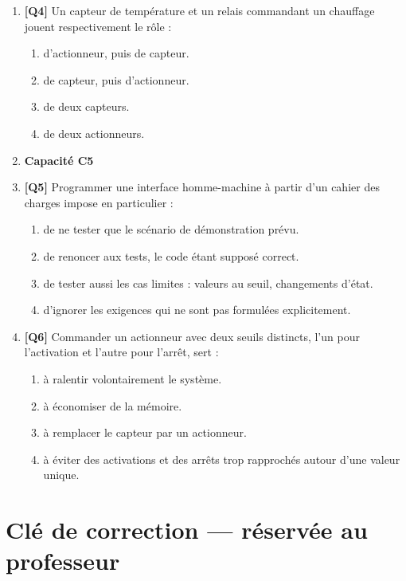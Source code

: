 \begin{enumerate}
\item \textbf{[Q4]} Un capteur de température et un relais commandant un chauffage jouent respectivement le rôle :
  \begin{enumerate}[label=\Alph*.]
    \item d'actionneur, puis de capteur.
    \item de capteur, puis d'actionneur.
    \item de deux capteurs.
    \item de deux actionneurs.
  \end{enumerate}

\item[] \textbf{Capacité C5}

\item \textbf{[Q5]} Programmer une interface homme-machine à partir d'un cahier des charges impose en particulier :
  \begin{enumerate}[label=\Alph*.]
    \item de ne tester que le scénario de démonstration prévu.
    \item de renoncer aux tests, le code étant supposé correct.
    \item de tester aussi les cas limites : valeurs au seuil, changements d'état.
    \item d'ignorer les exigences qui ne sont pas formulées explicitement.
  \end{enumerate}

\item \textbf{[Q6]} Commander un actionneur avec deux seuils distincts, l'un pour l'activation et l'autre pour l'arrêt, sert :
  \begin{enumerate}[label=\Alph*.]
    \item à ralentir volontairement le système.
    \item à économiser de la mémoire.
    \item à remplacer le capteur par un actionneur.
    \item à éviter des activations et des arrêts trop rapprochés autour d'une valeur unique.
  \end{enumerate}

\end{enumerate}

\ifnxVersionProfesseur
\clearpage
\section*{Clé de correction — réservée au professeur}

